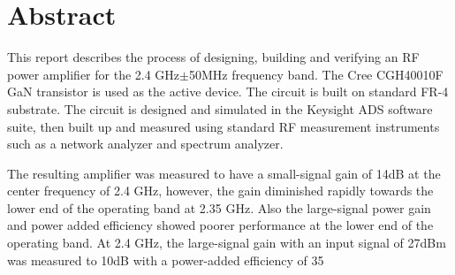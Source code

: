 \chapter{Abstract}
This report describes the process of designing, building and verifying an RF power amplifier for the 2.4 GHz$\pm$50MHz frequency band. The Cree CGH40010F GaN transistor is used as the active device. The circuit is built on standard FR-4 substrate. The circuit is designed and simulated in the Keysight ADS software suite, then built up and measured using standard RF measurement instruments such as a network analyzer and spectrum analyzer.

The resulting amplifier was measured to have a small-signal gain of 14dB at the center frequency of 2.4 GHz, however, the gain diminished rapidly towards the lower end of the operating band at 2.35 GHz. Also the large-signal power gain and power added efficiency showed poorer performance at the lower end of the operating band. At 2.4 GHz, the large-signal gain with an input signal of 27dBm was measured to 10dB with a power-added efficiency of 35%

